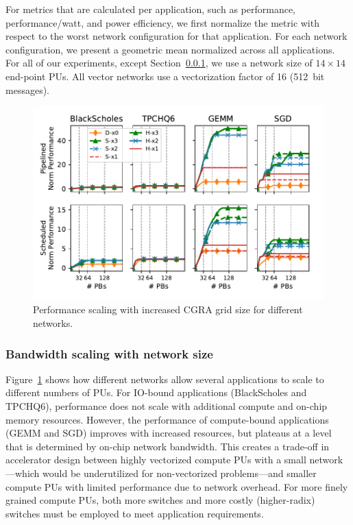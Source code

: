 For metrics that are calculated per application, such as performance, performance/watt, and power efficiency, we first normalize the metric with respect to the 
worst network configuration for that application. 
For each network configuration, we present a geometric mean normalized across all applications. 
For all of our experiments, except Section~\ref{sec:scale}, we use a network
size of $14\times14$ end-point PUs. All vector networks use a vectorization factor of 16 (\SI{512}{bit} messages).

\begin{figure}
\centering
\includegraphics[width=0.8\columnwidth]{network/figs/scale.pdf}
\caption{Performance scaling with increased CGRA grid size for different networks.}\label{fig:scale}
\end{figure}
\subsubsection{Bandwidth scaling with network size}\label{sec:scale}
Figure~\ref{fig:scale} shows how different networks allow several applications to scale to different numbers of PUs.
For IO-bound applications (BlackScholes and TPCHQ6), performance does not scale with additional compute and on-chip memory resources.
However, the performance of compute-bound applications (GEMM and SGD) improves with increased resources, but plateaus at a level that is determined by on-chip network bandwidth. 
This creates a trade-off in accelerator design between highly vectorized compute PUs with a small network---which would be underutilized for non-vectorized problems---and smaller compute PUs with limited performance due to network overhead. 
For more finely grained compute PUs, both more switches and more costly (higher-radix) switches must be employed to meet application requirements.

